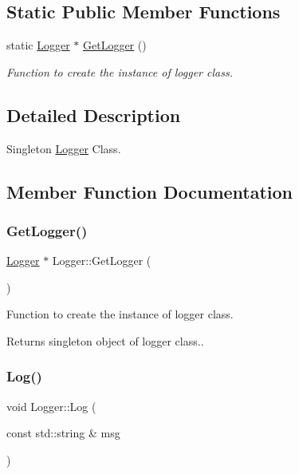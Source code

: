 \subsection*{Static Public Member Functions}
\begin{DoxyCompactItemize}
\item 
static \hyperlink{classLogger}{Logger} $\ast$ \hyperlink{classLogger_ae85cfbef8b7e6940475a5012fa1935c6}{Get\+Logger} ()
\begin{DoxyCompactList}\small\item\em Function to create the instance of logger class. \end{DoxyCompactList}\end{DoxyCompactItemize}


\subsection{Detailed Description}
Singleton \hyperlink{classLogger}{Logger} Class. 

\subsection{Member Function Documentation}
\mbox{\label{classLogger_ae85cfbef8b7e6940475a5012fa1935c6}} 
\subsubsection{\texorpdfstring{Get\+Logger()}{GetLogger()}}
{\footnotesize\ttfamily \hyperlink{classLogger}{Logger} $\ast$ Logger\+::\+Get\+Logger (\begin{DoxyParamCaption}{ }\end{DoxyParamCaption})\hspace{0.3cm}{\ttfamily [static]}}



Function to create the instance of logger class. 

\begin{DoxyReturn}{Returns}
singleton object of logger class.. 
\end{DoxyReturn}
\mbox{\label{classLogger_a4c67b32e3bdb174a86e507a82d8a2702}} 
\subsubsection{\texorpdfstring{Log()}{Log()}\hspace{0.1cm}{\footnotesize\ttfamily [1/4]}}
{\footnotesize\ttfamily void Logger\+::\+Log (\begin{DoxyParamCaption}\item[{const std\+::string \&}]{msg }\end{DoxyParamCaption})}



